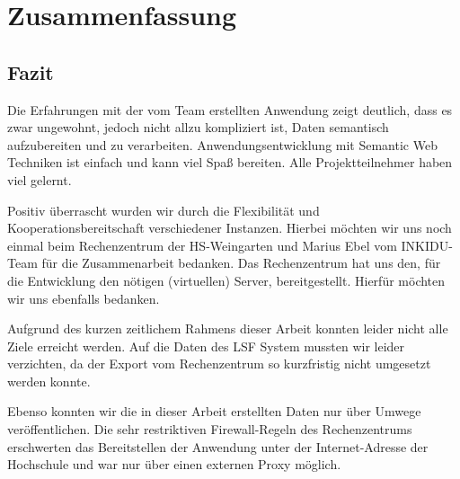 %
%
\chapter{Zusammenfassung}
\label{cap-zusafa}


\section{Fazit}
\label{sec-fazit}
Die Erfahrungen mit der vom Team erstellten Anwendung zeigt deutlich, dass es zwar ungewohnt, jedoch nicht allzu kompliziert ist, Daten semantisch aufzubereiten und zu verarbeiten. Anwendungsentwicklung mit Semantic Web Techniken ist einfach und kann viel Spaß bereiten. Alle Projektteilnehmer haben viel gelernt.

Positiv überrascht wurden wir durch die Flexibilität und Kooperationsbereitschaft verschiedener Instanzen.
Hierbei möchten wir uns noch einmal beim Rechenzentrum der HS-Weingarten und Marius Ebel vom INKIDU-Team für die Zusammenarbeit bedanken. Das Rechenzentrum hat uns den, für die Entwicklung den nötigen (virtuellen) Server, bereitgestellt. Hierfür möchten wir uns ebenfalls bedanken.

Aufgrund des kurzen zeitlichem Rahmens dieser Arbeit konnten leider nicht alle Ziele erreicht werden.
Auf die Daten des LSF System mussten wir leider verzichten, da der Export vom Rechenzentrum so kurzfristig nicht umgesetzt werden konnte.

Ebenso konnten wir die in dieser Arbeit erstellten Daten nur über Umwege veröffentlichen.
Die sehr restriktiven Firewall-Regeln des Rechenzentrums erschwerten das Bereitstellen der Anwendung unter der Internet-Adresse der Hochschule und war nur über einen externen Proxy möglich.


